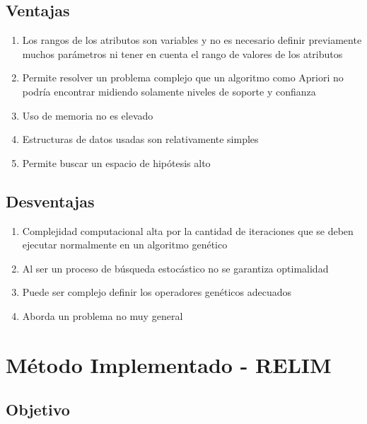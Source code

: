 \documentclass[12pt,spanish]{article}
\begin{document}
\subsection{Ventajas}
\begin{enumerate}
\item Los rangos de los atributos son variables y no es necesario definir previamente muchos par\'ametros ni tener en cuenta el rango de valores de los atributos
\item Permite resolver un problema complejo que un algoritmo como Apriori no podr\'ia encontrar midiendo solamente niveles de soporte y confianza
\item Uso de memoria no es elevado
\item Estructuras de datos usadas son relativamente simples
\item Permite buscar un espacio de hip\'otesis alto
\end{enumerate}

\subsection{Desventajas}
\begin{enumerate}
\item Complejidad computacional alta por la cantidad de iteraciones que se deben ejecutar normalmente en un algoritmo gen\'etico
\item Al ser un proceso de b\'usqueda estoc\'astico no se garantiza optimalidad
\item Puede ser complejo definir los operadores gen\'eticos adecuados
\item Aborda un problema no muy general
\end{enumerate}

\section{Método Implementado - RELIM}
\subsection{Objetivo}
\end{document}
